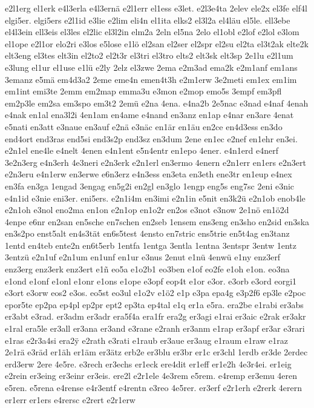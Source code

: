 {e2l1erg
el1erk
e4l3erla
e4l3ernä
e2l1err
el1ess
e3let.
e2l3e4ta
2elev
ele2x
el3fe
elf4l
elgi5er.
elgi5ers
e2l1id
e3lie
e2lim
eli4n
el1ita
elks2
el3l2a
el4läu
el5le.
ell3ebe
el4l3ein
ell3eis
el3les
el2lic
el3l2in
elm2a
2eln
el5na
2elo
el1obl
e2lof
e2lol
e3lom
el1ope
e2l1or
elo2ri
e3los
e5lose
e1lö
el2san
el2ser
el2spr
el2su
el2ta
el3t2ak
elte2k
elt3eng
el3tes
elt3in
el2to2
el2t3r
el3tri
el3tro
elts2
elt3sk
elt3sp
2e1lu
e2l1um
e3lung
el1ur
el1use
e1lü
e2ly
2elz
el3zwe
2ema
e2m3ad
ema2k
e2m1anf
em1ans
3emanz
e5mä
em4d3a2
2eme
eme4n
emen4t3h
e2m1erw
3e2meti
em1ex
em1im
em1int
emi3te
2emm
em2map
emma3u
e3mon
e2mop
emo5s
3empf
em3pfl
em2p3le
em2sa
em3spo
em3t2
2emü
e2na
4ena.
e4na2b
2e5nac
e3nad
e4naf
4enah
e4nak
en1al
ena3l2i
4en1am
en4ame
e4nand
en3anz
en1ap
e4nar
en3are
4enat
e5nati
en3att
e3naue
en3auf
e2nä
e3näc
en1är
en1äu
en2ce
en4d3ess
en3do
end4ort
end3ras
end5si
end3s2p
end3sz
en3dum
2ene
en1ec
e2nef
en1ehr
en3ei.
e2n1el
ene4le
e4nelt
4enen
e4n1ent
e5n4entr
en1epo
4ener.
e4n1erd
e4nerf
3e2n3erg
e4n3erh
4e3neri
e2n3erk
e2n1erl
en3ermo
4enern
e2n1err
en1ers
e2n3ert
e2n3eru
e4n1erw
en3erwe
e6n3erz
e4n3ess
en3eta
en3eth
ene3tr
en1eup
e4nex
en3fa
en3ga
1engad
3engag
en5g2i
en2gl
en3glo
1engp
eng5s
eng7sc
2eni
e3nic
e4n1id
e3nie
eni3er.
eni5ers.
e2n1i4m
en3imi
e2n1in
e5nit
en3k2ü
e2n1ob
enob4le
e2n1oh
e3nol
eno2ma
en1on
e2n1op
en1o2r
en2os
e3not
e3now
2e1nö
en1ö2d
4enpe
e6nr
en2san
en5sche
en7schen
en2seb
1ensem
ens3eng
en3sho
en2sid
en3ska
en3s2po
enst5alt
en4s3tät
en6s5test
4ensto
en7stric
ens5trie
en5t4ag
en3tanz
1entd
en4teb
ente2n
en6t5erb
1entfa
1entga
3entla
1entna
3entspr
3entw
1entz
3entzü
e2n1uf
e2n1um
en1unf
en1ur
e3nus
2enut
e1nü
4enwü
e1ny
enz3erf
enz3erg
enz3erk
enz3ert
e1ñ
eo5a
e1o2b1
eo3ben
e1of
eo2fe
e1oh
e1on.
eo3na
e1ond
e1onf
e1onl
e1onr
e1ons
e1ope
e3opf
eop4t
e1or
e3or.
e3orb
e3ord
eorgi1
e3ort
e3orw
eos2
e3os.
eo5st
eo3ul
e1o2v
e1ö2
e1p
e3pa
epa4g
e3p2f6
ep3le
e2poc
epor5te
ep2pa
ep4pl
ep2pr
ept2
ep3ta
ep4tal
e1q
er1a
e5ra.
era2be
e1rabi
er3abs
er3abt
e3rad.
er3adm
er3adr
era5f4a
era1fr
era2g
er3agi
e1rai
er3aic
e2rak
er3akr
e1ral
era5le
er3all
er3ana
er3and
e3rane
e2ranh
er3anm
e1rap
er3apf
er3ar
e3rari
e1ras
e2r3a4si
era2^^ff
e2rath
e3rati
e1raub
er3aue
er3aug
e1raum
e1raw
e1raz
2e1rä
e3räd
er1äh
er1äm
er3ätz
erb2e
er3blu
er3br
er1c
er3chl
1erdb
er3de
2erdec
erd3erw
2ere
4e5re.
e3rech
er3echs
er1eck
ere4dit
er1eff
er1e2h
4e3r4ei.
er1eig
e2rein
er3eing
er3einr
er3eis.
ere2l
e2r1ele
4e3rem
e5rem.
e4remp
er3emu
4eren
e5ren.
e5rena
e4rense
e4r3entf
e4rentn
e3reo
4e5rer.
er3erf
e2r1erh
e2rerk
4erern
er1err
er1ers
e4rersc
e2rert
e2r1erw
}
